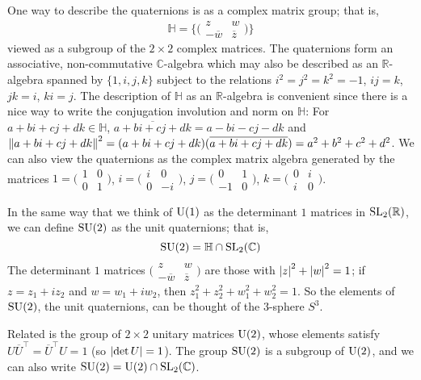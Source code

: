 \documentclass[../../rtnotes.tex]{subfiles}
\begin{document}
One way to describe the quaternions is as a complex matrix group; that is, 
\[\mathbb H = \{\bigl(\!\begin{smallmatrix}
	z & w \\ -\overline w & \overline z
\end{smallmatrix}\!\bigr)\}\]
viewed as a subgroup of the $2\times 2$ complex matrices. The quaternions form an associative, non-commutative $\mathbb C$-algebra which may also be described as an $\mathbb R$-algebra spanned by $\{1,i,j,k\}$ subject to the relations $i^2 = j^2 = k^2 = -1$, $ij=k$, $jk = i$, $ki = j$. The description of $\mathbb H$ as an $\mathbb R$-algebra is convenient since there is a nice way to write the conjugation involution and norm on $\mathbb H$: For $a+bi+cj+dk\in\mathbb H$, $\overline{a+bi+cj+dk} = a-bi-cj-dk$ and $\norm{a+bi+cj+dk}^2 = (a+bi+cj+dk)(\overline{a+bi+cj+dk}) = a^2 + b^2 + c^2 + d^2$. We can also view the quaternions as the complex matrix algebra generated by the matrices $1 = \bigl(\!\begin{smallmatrix}
	1 & 0 \\ 0 & 1
\end{smallmatrix}\!\bigr)$, $i = \bigl(\!\begin{smallmatrix}
	i & 0 \\ 0 & -i
\end{smallmatrix}\!\bigr)$, $j = \bigl(\!\begin{smallmatrix}
	0 & 1 \\ -1 & 0
\end{smallmatrix}\!\bigr)$, $k = \bigl(\!\begin{smallmatrix}
	0 & i \\ i & 0
\end{smallmatrix}\!\bigr)$.

In the same way that we think of $\operatorname{U}(1)$ as the determinant $1$ matrices in $\operatorname{SL}_2(\mathbb R)$, we can define $\operatorname{SU}(2)$ as the unit quaternions; that is, 
\[\operatorname{SU}(2)= \mathbb H\cap \operatorname{SL}_2(\mathbb C)\]
The determinant $1$ matrices $\bigl(\!\begin{smallmatrix}
	z & w \\ -\overline w & \overline z
\end{smallmatrix}\!\bigr)$ are those with $\abs{z}^2+\abs{w}^2=1$; if $z = z_1+iz_2$ and $w = w_1 + iw_2$, then $z_1^2+z_2^2+w_1^2+w_2^2 = 1$. So the elements of $\operatorname{SU}(2)$, the unit quaternions, can be thought of the $3$-sphere $S^3$. 

Related is the group of $2\times 2$ unitary matrices $\operatorname{U}(2)$, whose elements satisfy $U\overline U^\top = \overline U^\top U = 1$ (so $\abs{\det U} = 1$). The group $\operatorname{SU}(2)$ is a subgroup of $\operatorname{U}(2)$, and we can also write $\operatorname{SU}(2) = \operatorname{U}(2)\cap \operatorname{SL}_2(\mathbb C)$.
\end{document}
